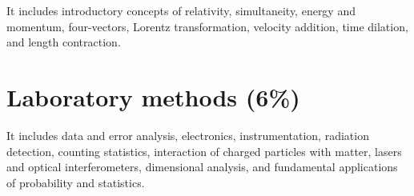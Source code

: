 \documentclass[12pt,a4paper]{article}
\begin{document}
It includes introductory concepts of relativity, simultaneity, energy and momentum, four-vectors, Lorentz transformation, velocity addition, time dilation, and length contraction.

\section{Laboratory methods (6\%)}

It includes data and error analysis, electronics, instrumentation, radiation detection, counting statistics, interaction of charged particles with matter, lasers and optical interferometers, dimensional analysis, and fundamental applications of probability and statistics.
\end{document}
